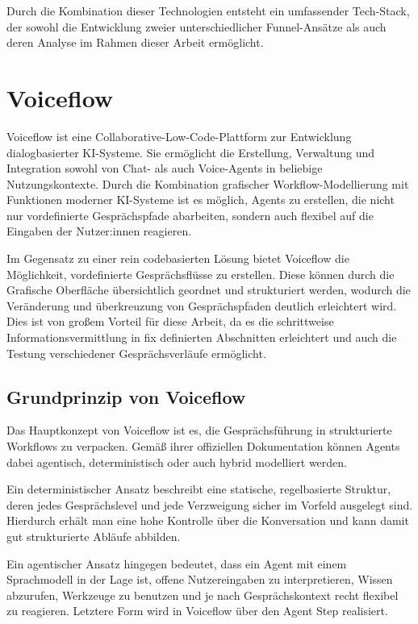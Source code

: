 Durch die Kombination dieser Technologien entsteht ein umfassender
Tech-Stack, der sowohl die Entwicklung zweier unterschiedlicher Funnel-Ansätze 
als auch deren Analyse im Rahmen dieser Arbeit ermöglicht.

\setauthor{\secondauthor}
\section{Voiceflow}

Voiceflow ist eine Collaborative-Low-Code-Plattform zur Entwicklung 
dialogbasierter KI-Systeme. Sie ermöglicht die Erstellung, Verwaltung und 
Integration sowohl von Chat- als auch Voice-Agents in beliebige Nutzungskontexte. 
Durch die Kombination grafischer Workflow-Modellierung mit Funktionen moderner 
KI-Systeme ist es möglich, Agents zu erstellen, die nicht nur vordefinierte 
Gesprächspfade abarbeiten, sondern auch flexibel auf die Eingaben der Nutzer:innen 
reagieren.

Im Gegensatz zu einer rein codebasierten Lösung bietet Voiceflow die Möglichkeit,
vordefinierte Gesprächsflüsse zu erstellen. Diese können durch die Grafische 
Oberfläche übersichtlich geordnet und strukturiert werden, wodurch die Veränderung
und überkreuzung von Gesprächspfaden deutlich erleichtert wird. Dies ist von großem
Vorteil für diese Arbeit, da es die schrittweise Informationsvermittlung in fix 
definierten Abschnitten erleichtert und auch die Testung verschiedener 
Gesprächsverläufe ermöglicht.

\subsection{Grundprinzip von Voiceflow}

Das Hauptkonzept von Voiceflow ist es, die Gesprächsführung in strukturierte 
Workflows zu verpacken. Gemäß ihrer offiziellen Dokumentation können Agents dabei 
agentisch, deterministisch oder auch hybrid modelliert werden.

Ein deterministischer Ansatz beschreibt eine statische, regelbasierte Struktur, 
deren jedes Gesprächslevel und jede Verzweigung sicher im Vorfeld ausgelegt sind. 
Hierdurch erhält man eine hohe Kontrolle über die Konversation und kann damit gut 
strukturierte Abläufe abbilden.

Ein agentischer Ansatz hingegen bedeutet, dass ein Agent mit einem Sprachmodell 
in der Lage ist, offene Nutzereingaben zu interpretieren, Wissen abzurufen, 
Werkzeuge zu benutzen und je nach Gesprächskontext recht flexibel zu reagieren. 
Letztere Form wird in Voiceflow über den Agent Step realisiert.\cite{VoiceflowDocs}

